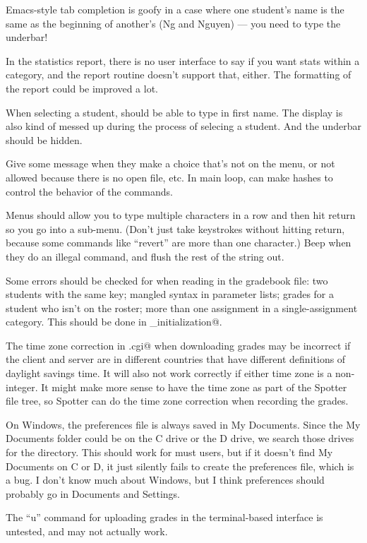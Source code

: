 \documentclass{opengrade_doc}
\begin{document}
Emacs-style tab completion is goofy in a case where one student's name
is the same as the beginning of another's (Ng and Nguyen) --- you need
to type the underbar!

In the statistics report, there is no user interface to say if you want
stats within a category, and the report routine doesn't support that,
either. The formatting of the report could be improved a lot.

When selecting a student, should be able to type in first name.
The display is also kind of messed up during the process of selecing
a student. And the underbar should be hidden.


Give some message when they make a choice that's
not on the menu, or not allowed because there is no open file, etc.
In main loop, can make hashes to control the behavior of the commands.

Menus should allow you to type multiple characters in a row and then
hit return so you go into a sub-menu. (Don't just take keystrokes without
hitting return, because some commands like ``revert'' are more than
one character.) Beep when they do an illegal command, and flush the
rest of the string out.

\label{bugs}
Some errors should be checked for when reading in the gradebook
file: two students with the same key; mangled syntax in parameter
lists; grades for a student who isn't on the roster; more than one
assignment in a single-assignment category.
This should be done in \verb@misc_initialization@.

The time zone correction in \verb@ServerOG.cgi@
when downloading grades may be incorrect if the client and
server are in different countries that have different definitions
of daylight savings time. It will also not work correctly if either
time zone is a non-integer. It might make more sense to have the time
zone as part of the Spotter file tree, so Spotter can do the time
zone correction when recording the grades.

On Windows, the preferences file is always saved in My Documents. Since
the My Documents folder could be on the C drive or the D drive, we search
those drives for the directory. This should work for must users, but if
it doesn't find My Documents on C or D, it just silently fails to create
the preferences file, which is a bug. I don't know much about Windows,
but I think preferences should probably go in Documents and Settings.

The ``u'' command for uploading grades in the terminal-based interface is
untested, and may not actually work.
\end{document}
